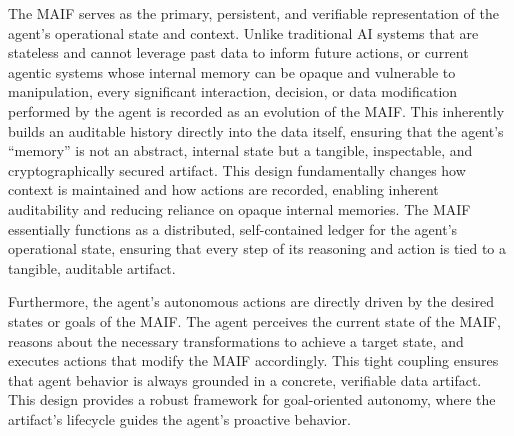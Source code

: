 \documentclass[conference]{IEEEtran}
\begin{document}
The MAIF serves as the primary, persistent, and verifiable representation of the agent's operational state and context. Unlike traditional AI systems that are stateless and cannot leverage past data to inform future actions, or current agentic systems whose internal memory can be opaque and vulnerable to manipulation\cite{ref1}, every significant interaction, decision, or data modification performed by the agent is recorded as an evolution of the MAIF. This inherently builds an auditable history directly into the data itself, ensuring that the agent's ``memory'' is not an abstract, internal state but a tangible, inspectable, and cryptographically secured artifact. This design fundamentally changes how context is maintained and how actions are recorded, enabling inherent auditability and reducing reliance on opaque internal memories. The MAIF essentially functions as a distributed, self-contained ledger for the agent's operational state, ensuring that every step of its reasoning and action is tied to a tangible, auditable artifact.

Furthermore, the agent's autonomous actions are directly driven by the desired states or goals of the MAIF. The agent perceives the current state of the MAIF, reasons about the necessary transformations to achieve a target state, and executes actions that modify the MAIF accordingly. This tight coupling ensures that agent behavior is always grounded in a concrete, verifiable data artifact. This design provides a robust framework for goal-oriented autonomy, where the artifact's lifecycle guides the agent's proactive behavior.
\end{document}
